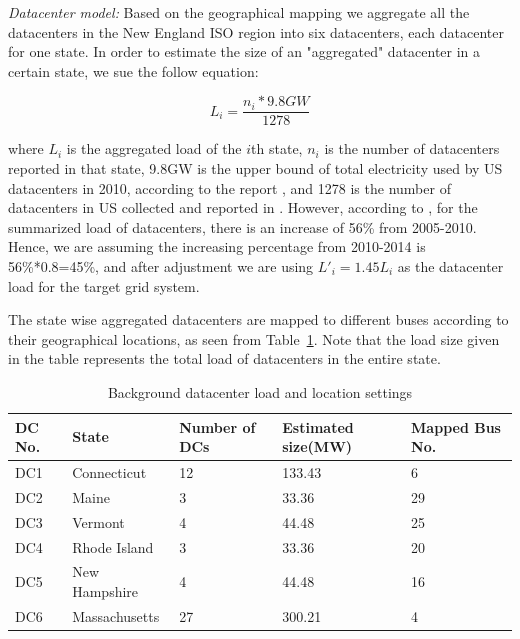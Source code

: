 {\em Datacenter model:}
Based on the geographical mapping we aggregate all the datacenters in the New England ISO region into six datacenters, each datacenter for one state. In order to estimate the size of an "aggregated" datacenter in a certain state, we sue the follow equation:

\begin{equation}
L_i=\frac{n_i*9.8GW}{1278}
\end{equation}

\noindent where $L_i$ is the aggregated load of the $i$th state, $n_i$ is the number of datacenters reported in that state,  9.8GW is the upper bound of total electricity used by US datacenters in 2010, according to the report \cite{Koomey2011}, and 1278 is the number of datacenters in US collected and reported in \cite{DCmap}. However, according to \cite{Koomey2011}, for the summarized load of datacenters, there is an increase of 56\% from 2005-2010. Hence, we are assuming the increasing percentage from 2010-2014 is 56\%*0.8=45\%, and after adjustment we are using $L'_i=1.45L_i$ as the datacenter load for the target grid system.

The state wise aggregated datacenters are mapped to different buses according to their geographical locations, as seen from Table~\ref{tab:dc_setting}. Note that the load size given in the table represents the total load of datacenters in the entire state.

\begin{table}[ht]
\begin{center}
\caption{Background datacenter load and location settings}
\begin{tabular}{|l|l|p{30pt}|p{30pt}|p{30pt}|}
\hline
DC No. & State & Number of DCs & Estimated size(MW) & Mapped Bus No.\\
\hline
DC1 & Connecticut & 12 &133.43 & 6\\
DC2 & Maine & 3 &33.36 & 29 \\
DC3 & Vermont & 4 &44.48 & 25 \\
DC4 & Rhode Island & 3 &33.36 & 20\\
DC5 & New Hampshire & 4& 44.48 & 16\\
DC6 & Massachusetts & 27& 300.21 & 4 \\
\hline

\end{tabular}
   \vspace{.05in}
\label{tab:dc_setting}
\end{center}
\end{table}


